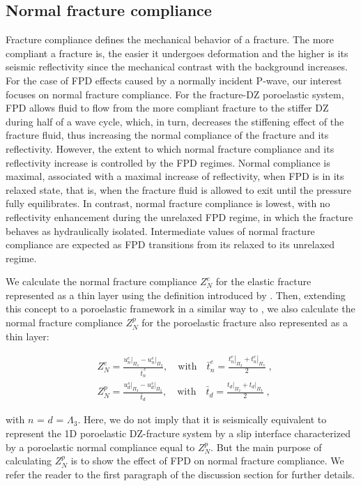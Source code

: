 \documentclass[draft]{agujournal2019}
\begin{document}
\subsection{Normal fracture compliance}
Fracture compliance defines the mechanical behavior of a fracture. The more compliant a fracture is, the easier it undergoes deformation and the higher is its seismic reflectivity since the mechanical contrast with the background increases. For the case of FPD effects caused by a normally incident P-wave, our interest focuses on normal fracture compliance. For the fracture-DZ poroelastic system, FPD  allows fluid to flow from the more compliant fracture to the stiffer DZ during half of a wave cycle, which, in turn, decreases the stiffening effect of the fracture fluid, thus 
increasing the normal compliance of the fracture and its reflectivity.
However, the extent to which normal fracture compliance and its reflectivity increase
is controlled by the FPD regimes. Normal compliance is maximal, associated with a maximal increase of reflectivity, when FPD is in its relaxed state, that is, when the fracture fluid is allowed to exit until the pressure fully equilibrates. In contrast,  normal fracture compliance is lowest, with no reflectivity enhancement during the unrelaxed FPD regime, in which the fracture behaves as hydraulically isolated. Intermediate values of normal fracture compliance are expected as FPD transitions from its relaxed to its unrelaxed regime.

We calculate the normal fracture compliance  $Z_N^e$ for the elastic fracture represented as a thin layer using the definition introduced by . Then, extending this concept to a poroelastic framework in a similar way to , we also calculate the normal fracture compliance $Z_N^p$ for the poroelastic fracture also represented as a thin layer:
\begin{linenomath*}
\begin{equation}\label{Eq.22}
\begin{split}
& Z_N^e =  \frac{ \left.u_{n}^e \right \rvert_{\Pi_3} - \left.u_{n}^e \right \rvert_{\Pi_2}}{\bar t^{\,e}_n},  \quad \text{with} \quad
\bar t^{e}_{n} = \frac{ \left.t^{e}_{n} \right \rvert_{\Pi_2}+ \left.t^{e}_n \right \rvert_{\Pi_3}}{2}\; , \\
& Z_N^p =  \frac{ \left.u_{d }^s \right \rvert_{\Pi_3} - \left.u_{d}^s \right \rvert_{\Pi_2}}{\bar t_d},  \quad \text{with} \quad
\bar t_{d} = \frac{ \left.t_{d} \right \rvert_{\Pi_2}+ \left.t_{d} \right \rvert_{\Pi_3}}{2} \;,
\end{split}
\end{equation} 
\end{linenomath*}
with $n$ = $d$  = $\Lambda_3$.
Here, we do not imply that it is seismically equivalent to represent the 1D poroelastic DZ-fracture system by a slip interface characterized by a  poroelastic normal compliance equal to $Z_N^p$. But the main purpose of calculating $Z_N^p$ is to show the effect of FPD on normal fracture compliance. We refer the reader to the first paragraph of the discussion section for further details.
\end{document}

